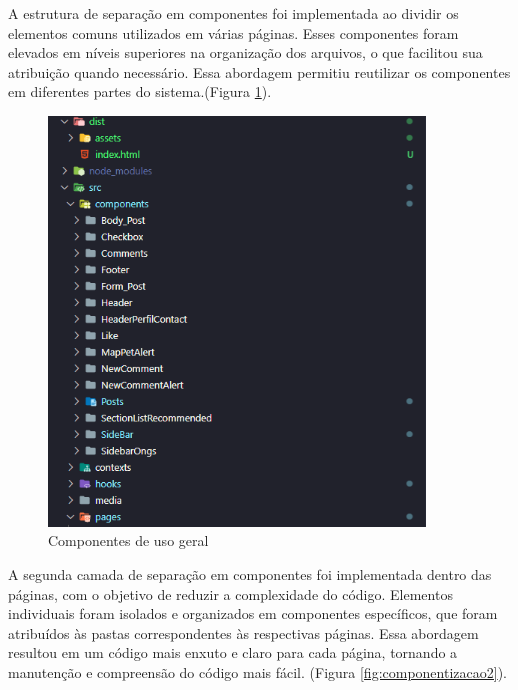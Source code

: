 \begin{itemize}
A estrutura de separação em componentes foi implementada ao dividir os elementos comuns utilizados em várias páginas. Esses componentes foram elevados em níveis superiores na organização dos arquivos, o que facilitou sua atribuição quando necessário. Essa abordagem permitiu reutilizar os componentes em diferentes partes do sistema.(Figura \ref{fig:componentizacao}).

\begin{figure}[htb]
     \centering
     \includegraphics[width=10cm]{arquivos/Figuras/componentes1.png}
     \caption{Componentes de uso geral}
         \label{fig:componentizacao}
\end{figure}
\newpage
A segunda camada de separação em componentes foi implementada dentro das páginas, com o objetivo de reduzir a complexidade do código. Elementos individuais foram isolados e organizados em componentes específicos, que foram atribuídos às pastas correspondentes às respectivas páginas. Essa abordagem resultou em um código mais enxuto e claro para cada página, tornando a manutenção e compreensão do código mais fácil. (Figura \ref{fig:componentizacao2}).


\end{itemize}
